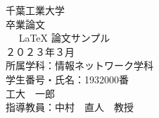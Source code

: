 \documentclass[12pt]{ltjsreport}%
\begin{document}
\begin{titlepage}
    \begin{center}
        \vspace*{50truept}
        {\Huge 千葉工業大学}\\
        \vspace{20truept}
        {\Huge 卒業論文}\\
        \vspace{180truept}
        {\Huge　 {\LaTeX} 論文サンプル} \\       
        \vspace{30truept}
        {\Large ２０２３年３月}\\
        \vspace{160truept}
        {\Large 所属学科：情報ネットワーク学科}\\
        \vspace{10truept}
        {\Large 学生番号・氏名：1932000番}\\
        \vspace{10truept}
        {\Large 工大　一郎}\\
        \vspace{30truept}
        {\Large 指導教員：中村　直人　教授}
    \end{center}
\end{titlepage}

\tableofcontents                 	%
\listoffigures			%
\listoftables				%
\baselineskip 20pt               	%
\clearpage
{}


%








\newpage


\end{document}
